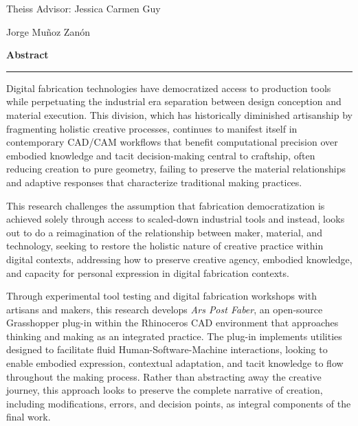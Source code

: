 \noindent
\begin{minipage}[t]{0.5\textwidth}
\raggedright
Theiss Advisor: Jessica Carmen Guy 
\end{minipage}%
\begin{minipage}[t]{0.5\textwidth}
\raggedleft
Jorge Muñoz Zanón
\end{minipage}
\vspace{1cm}

\noindent
{\Large\textbf{Abstract}}
\vspace{0.3cm}
\hrule
\vspace{0.8cm}

\setlength{\parindent}{0pt}

Digital fabrication technologies have democratized access to production tools while perpetuating the industrial era separation between design conception and material execution. This division, which has historically diminished artisanship by fragmenting holistic creative processes, continues to manifest itself in contemporary CAD/CAM workflows that benefit computational precision over embodied knowledge and tacit decision-making central to craftship, often reducing creation to pure geometry, failing to preserve the material relationships and adaptive responses that characterize traditional making practices.

\vspace{0.5cm}

This research challenges the assumption that fabrication democratization is achieved solely through access to scaled-down industrial tools and instead, looks out to do a reimagination of the relationship between maker, material, and technology, seeking to restore the holistic nature of creative practice within digital contexts, addressing how to preserve creative agency, embodied knowledge, and capacity for personal expression in digital fabrication contexts.

\vspace{0.5cm}

Through experimental tool testing and digital fabrication workshops with artisans and makers, this research develops \textit{Ars Post Faber}, an open-source Grasshopper plug-in within the Rhinoceros CAD environment that approaches thinking and making as an integrated practice. The plug-in implements utilities designed to facilitate fluid Human-Software-Machine interactions, looking to enable embodied expression, contextual adaptation, and tacit knowledge to flow throughout the making process. Rather than abstracting away the creative journey, this approach looks to preserve the complete narrative of creation, including modifications, errors, and decision points, as integral components of the final work.

